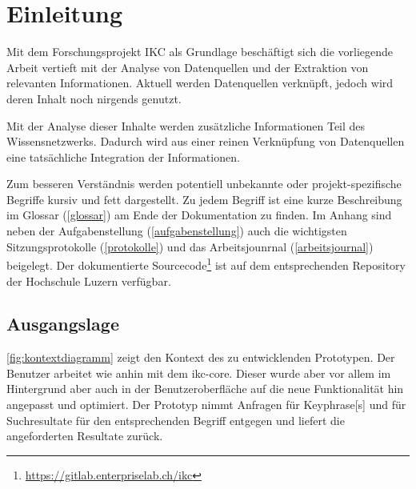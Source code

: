 \chapter{Einleitung}

Mit dem Forschungsprojekt \gls{IKC} als Grundlage beschäftigt sich die vorliegende Arbeit vertieft mit der Analyse von Datenquellen und der Extraktion von relevanten Informationen. Aktuell werden Datenquellen verknüpft, jedoch wird deren Inhalt noch nirgends genutzt. 

Mit der Analyse dieser Inhalte werden zusätzliche Informationen Teil des Wissensnetzwerks. Dadurch wird aus einer reinen Verknüpfung von Datenquellen eine tatsächliche Integration der Informationen.



Zum besseren Verständnis werden potentiell unbekannte oder projekt-spezifische Begriffe kursiv und fett dargestellt. Zu jedem Begriff ist eine kurze Beschreibung im Glossar (\autoref{glossar}) am Ende der Dokumentation zu finden. Im Anhang sind neben der Aufgabenstellung (\autoref{aufgabenstellung}) auch die wichtigsten Sitzungsprotokolle (\autoref{protokolle}) und das Arbeitsjounrnal (\autoref{arbeitsjournal}) beigelegt. Der dokumentierte Sourcecode\footnote{\url{https://gitlab.enterpriselab.ch/ikc}} ist auf dem entsprechenden Repository der Hochschule Luzern verfügbar.

\section{Ausgangslage}

\autoref{fig:kontextdiagramm} zeigt den Kontext des zu entwicklenden Prototypen. Der Benutzer arbeitet wie anhin mit dem \gls{ikc-core}. Dieser wurde aber vor allem im Hintergrund aber auch in der Benutzeroberfläche auf die neue Funktionalität hin angepasst und optimiert. Der Prototyp nimmt Anfragen für \gls{Keyphrase}[s] und für Suchresultate für den entsprechenden Begriff entgegen und liefert die angeforderten Resultate zurück.

